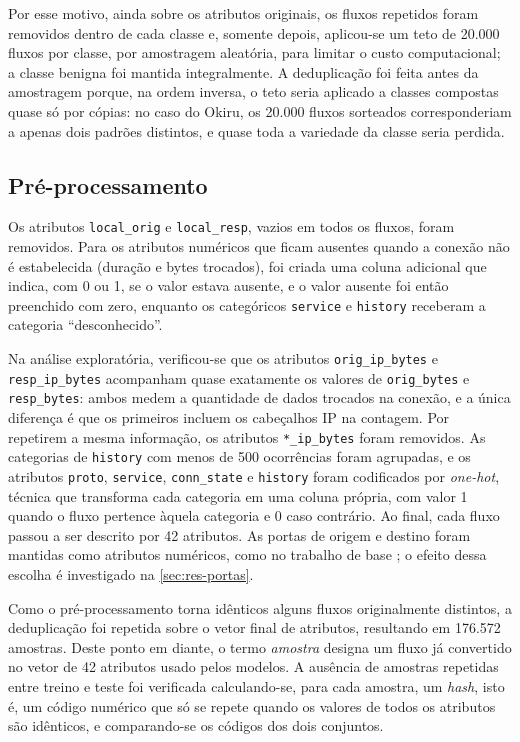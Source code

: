 \documentclass[alpha-refs,brazilian]{CC-EC_TF-TC}
\begin{document}
Por esse motivo, ainda sobre os atributos originais, os fluxos repetidos foram removidos dentro de cada classe e, somente depois, aplicou-se um teto de 20.000 fluxos por classe, por amostragem aleatória, para limitar o custo computacional; a classe benigna foi mantida integralmente. A deduplicação foi feita antes da amostragem porque, na ordem inversa, o teto seria aplicado a classes compostas quase só por cópias: no caso do Okiru, os 20.000 fluxos sorteados corresponderiam a apenas dois padrões distintos, e quase toda a variedade da classe seria perdida.

\subsection{Pré-processamento}
\label{sec:preproc}

Os atributos \texttt{local\_orig} e \texttt{local\_resp}, vazios em todos os fluxos, foram removidos. Para os atributos numéricos que ficam ausentes quando a conexão não é estabelecida (duração e bytes trocados), foi criada uma coluna adicional que indica, com 0 ou 1, se o valor estava ausente, e o valor ausente foi então preenchido com zero, enquanto os categóricos \texttt{service} e \texttt{history} receberam a categoria ``desconhecido''.

Na análise exploratória, verificou-se que os atributos \texttt{orig\_ip\_bytes} e \texttt{resp\_ip\_bytes} acompanham quase exatamente os valores de \texttt{orig\_bytes} e \texttt{resp\_bytes}: ambos medem a quantidade de dados trocados na conexão, e a única diferença é que os primeiros incluem os cabeçalhos IP na contagem. Por repetirem a mesma informação, os atributos \texttt{*\_ip\_bytes} foram removidos. As categorias de \texttt{history} com menos de 500 ocorrências foram agrupadas, e os atributos \texttt{proto}, \texttt{service}, \texttt{conn\_state} e \texttt{history} foram codificados por \textit{one-hot}, técnica que transforma cada categoria em uma coluna própria, com valor 1 quando o fluxo pertence àquela categoria e 0 caso contrário. Ao final, cada fluxo passou a ser descrito por 42 atributos. As portas de origem e destino foram mantidas como atributos numéricos, como no trabalho de base \citep{souza2024avaliacao}; o efeito dessa escolha é investigado na \autoref{sec:res-portas}.

Como o pré-processamento torna idênticos alguns fluxos originalmente distintos, a deduplicação foi repetida sobre o vetor final de atributos, resultando em 176.572 amostras. Deste ponto em diante, o termo \textit{amostra} designa um fluxo já convertido no vetor de 42 atributos usado pelos modelos. A ausência de amostras repetidas entre treino e teste foi verificada calculando-se, para cada amostra, um \textit{hash}, isto é, um código numérico que só se repete quando os valores de todos os atributos são idênticos, e comparando-se os códigos dos dois conjuntos.
\end{document}
